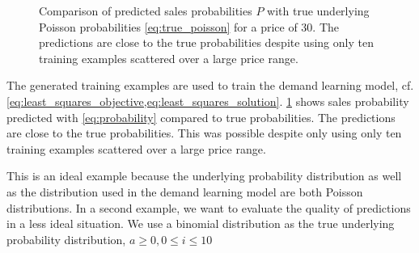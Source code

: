 \begin{figure}[t]
	\caption[Comparison of Predicted Probabilites with Underlying Poisson Probabilities]{Comparison of predicted sales probabilities $P$ with true underlying Poisson probabilities \cref{eq:true_poisson} for a price of 30. The predictions are close to the true probabilities despite using only ten training examples scattered over a large price range.}
	\label{fig:probs_poisson}
\end{figure}

The generated training examples are used to train the demand learning model, cf. \cref{eq:least_squares_objective,eq:least_squares_solution}.
\cref{fig:probs_poisson} shows sales probability predicted with \cref{eq:probability} compared to true probabilities.
The predictions are close to the true probabilities.
This was possible despite only using only ten training examples scattered over a large price range.

This is an ideal example because the underlying probability distribution as well as the distribution used in the demand learning model are both Poisson distributions.
In a second example, we want to evaluate the quality of predictions in a less ideal situation.
We use a binomial distribution as the true underlying probability distribution, $a \geq 0, 0 \leq i \leq 10$

